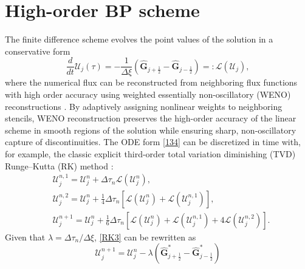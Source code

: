 \documentclass[times,final,11pt]{elsarticle}
\numberwithin{equation}{section}
\theoremstyle{definition}
\theoremstyle{remark}
\begin{document}
\section{High-order BP scheme}\label{0sec4}

The finite difference scheme evolves the point values of the solution in a conservative form
\begin{equation}
\label{134}
	\frac{d}{dt} \boldsymbol{\mathcal{U}}_j (\tau) = - \frac{1}{\Delta \xi} \left( \widehat{\mathbf{G}}_{j + \frac{1}{2}} - \widehat{\mathbf{G}}_{j - \frac{1}{2}} \right) =: \mathcal{L} \left(\boldsymbol{\mathcal{U}}_j \right),
\end{equation}
where the numerical flux can be reconstructed from neighboring flux functions with high order accuracy using weighted essentially non-oscillatory (WENO) reconstructions \cite{shu1998essentially,jiang1996efficient}. By adaptively assigning nonlinear weights to neighboring stencils, WENO reconstruction preserves the high-order accuracy of the linear scheme in smooth regions of the solution while ensuring sharp, non-oscillatory capture of discontinuities. The ODE form \eqref{134} can be discretized in time with, for example, the classic explicit third-order total variation diminishing (TVD) Runge–Kutta (RK) method \cite{gottlieb2001strong}: 
\begin{equation}
	\label{RK3}
	\begin{aligned}
		&\boldsymbol{\mathcal{U}}_j^{n, 1} = \boldsymbol{\mathcal{U}}_j^{n} + \Delta \tau_n \mathcal{L} \left(\boldsymbol{\mathcal{U}}_j^{n} \right), \\
		&\boldsymbol{\mathcal{U}}_j^{n, 2} = \boldsymbol{\mathcal{U}}_j^{n} + \frac{1}{4} \Delta \tau_n \left[ \mathcal{L} \left(\boldsymbol{\mathcal{U}}_j^{n} \right) + \mathcal{L} \left(\boldsymbol{\mathcal{U}}_j^{n, 1} \right) \right], \\
		&\boldsymbol{\mathcal{U}}_j^{n + 1} = \boldsymbol{\mathcal{U}}_j^{n} + \frac{1}{6} \Delta \tau_n \left[ \mathcal{L} \left(\boldsymbol{\mathcal{U}}_j^{n} \right) + \mathcal{L} \left(\boldsymbol{\mathcal{U}}_j^{n, 1} \right) + 4 \mathcal{L} \left(\boldsymbol{\mathcal{U}}_j^{n, 2} \right) \right].
	\end{aligned}
\end{equation}
Given that $\lambda = \Delta \tau_n / \Delta \xi$, \eqref{RK3} can be rewritten as 
\begin{equation}
\label{RKWENO}
    \boldsymbol{\mathcal{U}}_j^{n + 1} = \boldsymbol{\mathcal{U}}_j^{n} - \lambda \left(\widehat{\mathbf{G}}_{j + \frac{1}{2}}^* - \widehat{\mathbf{G}}_{j - \frac{1}{2}}^*\right)
\end{equation}
\end{document}
